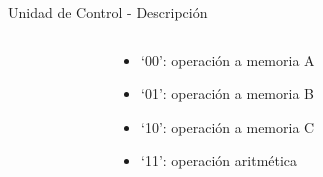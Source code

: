 \begin{frame}{Unidad de Control - Descripción}
\begin{itemize}
{\begin{columns}[T]
\begin{column}{.5\textwidth}
\begin{columns}[T]
\begin{column}{.2\textwidth}
	      \end{column}
          \begin{column}{.8\textwidth}
          \begin{itemize}
            \item<7-> `00': operación a memoria A
            \item<7-> `01': operación a memoria B
            \item<7-> `10': operación a memoria C
            \item<7-> `11': operación aritmética
          \end{itemize}
          \end{column}
	      \begin{column}{.1\textwidth}
	      
	      \end{column}
	    \end{columns}
	  \end{column}
    \end{columns}
    }
 
  \end{itemize}
\end{frame}

